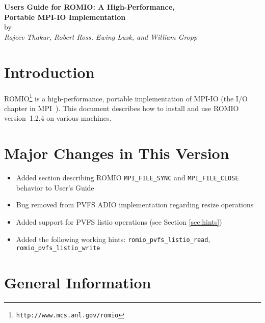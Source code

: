 \tableofcontents
\thispagestyle{empty}
\newpage

\setcounter{page}{1}
\begin{center}
{\bf Users Guide for ROMIO:  A High-Performance,\\[1ex]
Portable MPI-IO Implementation} \\ [2ex]
by \\ [2ex]
{\it Rajeev Thakur, Robert Ross, Ewing Lusk, and William Gropp}

\end{center}
\begin{abstract}
\noindent
ROMIO is a high-performance, portable implementation of MPI-IO (the
I/O chapter in the \mbox{MPI Standard}). This document describes how to install and use
ROMIO version~1.2.4 on various machines.
\end{abstract}

\section{Introduction} 

ROMIO\footnote{\tt http://www.mcs.anl.gov/romio} is a
high-performance, portable implementation of MPI-IO (the I/O chapter in 
MPI~\cite{mpi97a}). This document describes how to install and use
ROMIO version~1.2.4 on various machines.


%
%
\section{Major Changes in This Version}
\begin{itemize}
\item Added section describing ROMIO \texttt{MPI\_FILE\_SYNC} and
      \texttt{MPI\_FILE\_CLOSE} behavior to User's Guide
\item Bug removed from PVFS ADIO implementation regarding resize operations
\item Added support for PVFS listio operations (see Section \ref{sec:hints})
\item Added the following working hints:
      \texttt{romio\_pvfs\_listio\_read}, \texttt{romio\_pvfs\_listio\_write}
\end{itemize}

%
%
\section{General Information}

